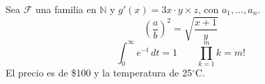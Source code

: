 \documentclass{article}
\begin{document}
Sea $\mathcal{F}$ una familia en $\mathbb{N}$ y $g'(x) = 3x \cdot y \times z$, con $a_1, \ldots, a_n$.
\[ \left( \frac{a}{b} \right)^2 = \sqrt{\frac{x+1}{y}} \]
\[ \int_{0}^{\infty} e^{-t}\, dt = 1 \qquad \prod_{k=1}^{m} k = m! \]
El precio es de \$100 y la temperatura de 25$^\circ$C.
\end{document}
